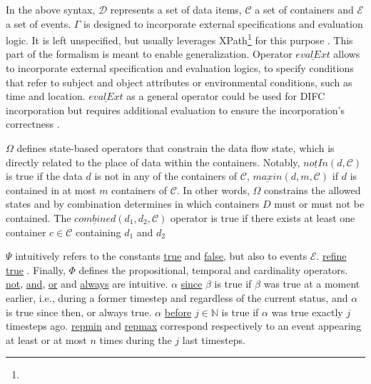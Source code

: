 In the above syntax, $\mathcal{D}$ represents a set of data items, $\mathcal{C}$ a set of containers and $\mathcal{E}$ a set of events.
$\Gamma$ is designed to incorporate external specifications and evaluation logic. It is left unspecified, but usually leverages XPath\footnote{} for this purpose \cite{Feth2012, Wuchner2012}. This part of the formalism is meant to enable generalization. Operator $\underline{evalExt}$ allows to incorporate external specification and evaluation logics, to specify conditions that refer to subject and object attributes or environmental conditions, such as time and location. $\underline{evalExt}$ as a general operator could be used for DIFC incorporation but requires additional evaluation to ensure the incorporation's correctness \cite{Kelbert2018}.

$\Omega$ defines state-based operators that constrain the data flow state, which is directly related to the place of data within the containers. Notably, $\underline{notIn}(d,\mathcal{C})$ is true if the data $d$ is not in any of the containers of $\mathcal{C}$, $\underline{maxin}(d,m,\mathcal{C})$ if $d$ is contained in at most $m$ containers of $\mathcal{C}$. In other words, $\Omega$ constrains the allowed states and by combination determines in which containers $D$ must or must not be contained. The $\underline{combined}(d_1, d_2, \mathcal{C})$ operator is true if there exists at least one container $c \in \mathcal{C}$ containing $d_1$ and $d_2$

$\Psi$ intuitively refers to the constants \underline{true} and \underline{false}, but also to events $\mathcal{E}$.  \underline{refine} \underline{true} . Finally, $\Phi$ defines the propositional, temporal and cardinality operators. \underline{not}, \underline{and}, \underline{or} and \underline{always} are intuitive. $\alpha$ \underline{since} $\beta$ is true if $\beta$ was true at a moment earlier, i.e., during a former timestep and regardless of the current status, and $\alpha$ is true since then, or always true. $\alpha$ \underline{before} $j \in \mathbb{N}$ is true if $\alpha$ was true exactly $j$ timesteps ago. 
\underline{repmin} and \underline{repmax} correspond respectively to an event appearing at least or at most $n$ times during the $j$ last timesteps.

